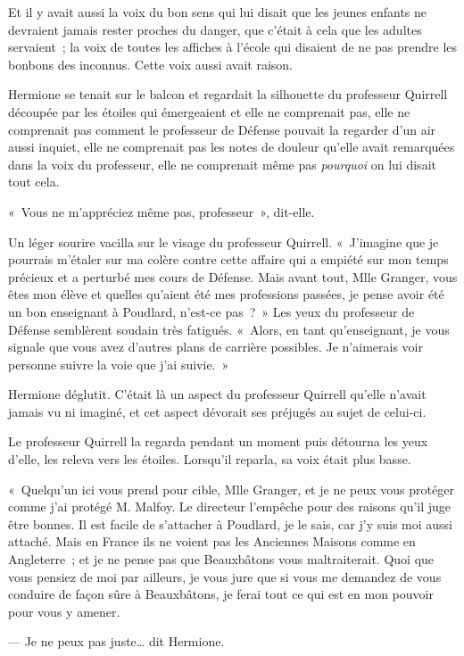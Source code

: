 Et il y avait aussi la voix du bon sens qui lui disait que les jeunes enfants ne devraient jamais rester proches du danger, que c'était à cela que les adultes servaient~; la voix de toutes les affiches à l'école qui disaient de ne pas prendre les bonbons des inconnus. Cette voix aussi avait raison.

Hermione se tenait sur le balcon et regardait la silhouette du professeur Quirrell découpée par les étoiles qui émergeaient et elle ne comprenait pas, elle ne comprenait pas comment le professeur de Défense pouvait la regarder d'un air aussi inquiet, elle ne comprenait pas les notes de douleur qu'elle avait remarquées dans la voix du professeur, elle ne comprenait même pas \emph{pourquoi} on lui disait tout cela.

«~Vous ne m'appréciez même pas, professeur~», dit-elle.

Un léger sourire vacilla sur le visage du professeur Quirrell. «~J'imagine que je pourrais m'étaler sur ma colère contre cette affaire qui a empiété sur mon temps précieux et a perturbé mes cours de Défense. Mais avant tout, Mlle Granger, vous êtes mon élève et quelles qu'aient été mes professions passées, je pense avoir été un bon enseignant à Poudlard, n'est-ce pas~?~» Les yeux du professeur de Défense semblèrent soudain très fatigués. «~Alors, en tant qu'enseignant, je vous signale que vous avez d'autres plans de carrière possibles. Je n'aimerais voir personne suivre la voie que j'ai suivie.~»

Hermione déglutit. C'était là un aspect du professeur Quirrell qu'elle n'avait jamais vu ni imaginé, et cet aspect dévorait ses préjugés au sujet de celui-ci.

Le professeur Quirrell la regarda pendant un moment puis détourna les yeux d'elle, les releva vers les étoiles. Lorsqu'il reparla, sa voix était plus basse.

«~Quelqu'un ici vous prend pour cible, Mlle Granger, et je ne peux vous protéger comme j'ai protégé M. Malfoy. Le directeur l'empêche pour des raisons qu'il juge être bonnes. Il est facile de s'attacher à Poudlard, je le sais, car j'y suis moi aussi attaché. Mais en France ils ne voient pas les Anciennes Maisons comme en Angleterre~; et je ne pense pas que Beauxbâtons vous maltraiterait. Quoi que vous pensiez de moi par ailleurs, je vous jure que si vous me demandez de vous conduire de façon sûre à Beauxbâtons, je ferai tout ce qui est en mon pouvoir pour vous y amener.

--- Je ne peux pas juste… dit Hermione.

